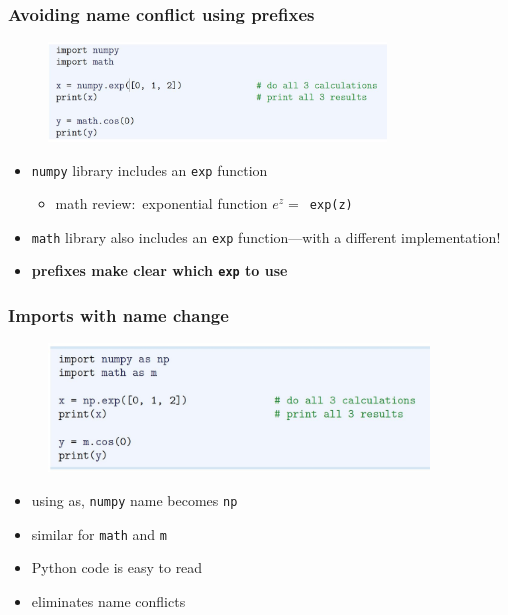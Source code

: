 \documentclass[14pt]{beamer}
\newcommand\red[1]{{\color{red} #1}}
\newcommand\green[1]{{\color{green} #1}}
\newcommand{\cmark}{\ding{51}}%
\begin{document}
\begin{frame}[fragile]
\frametitle{Avoiding name conflict using prefixes}

\begin{figure}[ht]
	\centering
	\includegraphics[width=0.8\textwidth]{figures/LLp17}
\end{figure}
\begin{itemize}
	\item \texttt{numpy} library includes an \texttt{exp} function
	\begin{itemize}
		\item math review:~exponential function $e^{z} =$~\texttt{exp(z)}
	\end{itemize}
	\item \texttt{math} library also includes an \texttt{exp} function---with a different implementation!
	\item[\green{\cmark}] \textbf{prefixes make clear which \texttt{exp} to use}
\end{itemize}

\end{frame}


\begin{frame}[fragile]
\frametitle{Imports with name change}

\begin{figure}[ht]
	\centering
	\includegraphics[width=0.9\textwidth]{figures/LLp18}
\end{figure}
\vspace*{-8mm}
\begin{itemize}
\item using \red{as}, \texttt{numpy} name becomes \texttt{np} 
\item similar for \texttt{math} and \texttt{m}
\item[\green{\cmark}] Python code is easy to read
\item[\green{\cmark}\green{\cmark}] eliminates name conflicts
\end{itemize}

\end{frame}
\end{document}
